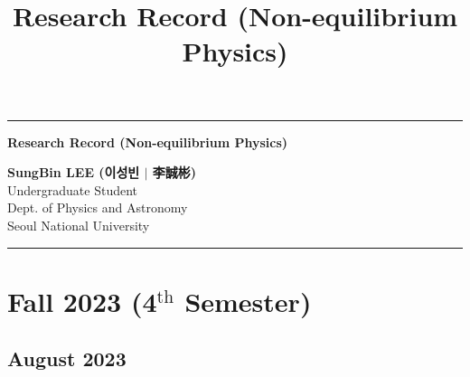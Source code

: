 \documentclass[12pt]{scrartcl}
\title{Research Record (Non-equilibrium Physics)}
\numberwithin{equation}{subsubsection}
\begin{document}
\begin{center}
	\hrule
	\vspace{.4cm}
	{\textbf { \large Research Record (Non-equilibrium Physics)}}
\end{center}
\hspace*{\fill} \textbf{SungBin LEE (이성빈 $|$ 李誠彬)} \\
\hspace*{\fill} Undergraduate Student   \\
\hspace*{\fill} Dept. of Physics and Astronomy   \\
\hspace*{\fill} Seoul National University \\
\hrule

\tableofcontents %

\newpage
\section{Fall 2023 (4$^{\mathrm{th}}$ Semester)} %

\subsection{August 2023}
\end{document}
